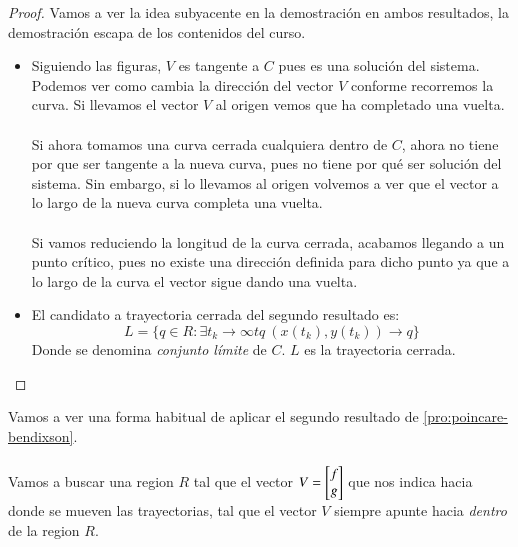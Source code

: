 \begin{proof}
    Vamos a ver la idea subyacente en la demostración en ambos resultados, la demostración escapa de los contenidos del curso.
    \begin{itemize}
        \item Siguiendo las figuras, $V$ es tangente a $C$ pues es una solución del sistema. Podemos ver como cambia la dirección del vector $V$ conforme recorremos la curva. Si llevamos el vector $V$ al origen vemos que ha completado una vuelta.\\\\
        Si ahora tomamos una curva cerrada cualquiera dentro de $C$, ahora no tiene por que ser tangente a la nueva curva, pues no tiene por qué ser solución del sistema. Sin embargo, si lo llevamos al origen volvemos a ver que el vector a lo largo de la nueva curva completa una vuelta.\\\\
        Si vamos reduciendo la longitud de la curva cerrada, acabamos llegando a un punto crítico, pues no existe una dirección definida para dicho punto ya que a lo largo de la curva el vector sigue dando una vuelta.
        \item El candidato a trayectoria cerrada del segundo resultado es:
        $$
            L = \{ q \in R : \exists t_k \to \infty tq\ (x(t_k), y(t_k)) \to q \}
        $$
        Donde se denomina \textit{conjunto límite} de $C$. $L$ es la trayectoria cerrada.
    \end{itemize}
\end{proof}
\begin{obs}
    Vamos a ver una forma habitual de aplicar el segundo resultado de \ref{pro:poincare-bendixson}.\\\\
    Vamos a buscar una region $R$ tal que el vector $V = \mx{f \\ g}$ que nos indica hacia donde se mueven las trayectorias, tal que el vector $V$ siempre apunte hacia \textit{dentro} de la region $R$.
\end{obs}
